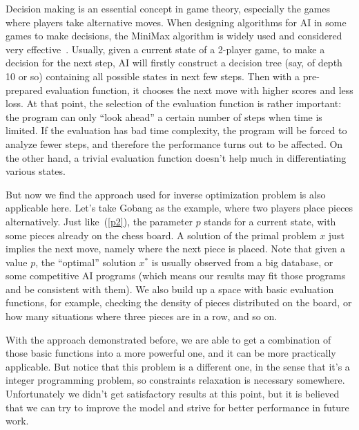 Decision making is an essential concept in game theory, especially the games where players take alternative moves. When designing algorithms for AI in some games to make decisions, the MiniMax algorithm is widely used and considered very effective~\cite{gilbert1985}. Usually, given a current state of a 2-player game, to make a decision for the next step, AI will firstly construct a decision tree (say, of depth 10 or so) containing all possible states in next few steps. Then with a pre-prepared evaluation function, it chooses the next move with higher scores and less loss. At that point, the selection of the evaluation function is rather important: the program can only ``look ahead'' a certain number of steps when time is limited. If the evaluation has bad time complexity, the program will be forced to analyze fewer steps, and therefore the performance turns out to be affected. On the other hand, a trivial evaluation function doesn't help much in differentiating various states.

But now we find the approach used for inverse optimization problem is also applicable here. Let's take Gobang as the example, where two players place pieces alternatively. Just like~(\ref{p2}), the parameter $p$ stands for a current state, with some pieces already on the chess board. A solution of the primal problem $x$ just implies the next move, namely where the next piece is placed. Note that given a value $p$, the ``optimal'' solution $x^*$ is usually observed from a big database, or some competitive AI programs (which means our results may fit those programs and be consistent with them). We also build up a space with basic evaluation functions, for example, checking the density of pieces distributed on the board, or how many situations where three pieces are in a row, and so on.

With the approach demonstrated before, we are able to get a combination of those basic functions into a more powerful one, and it can be more practically applicable. But notice that this problem is a different one, in the sense that it's a integer programming problem, so constraints relaxation is necessary somewhere. Unfortunately we didn't get satisfactory results at this point, but it is believed that we can try to improve the model and strive for better performance in future work.
